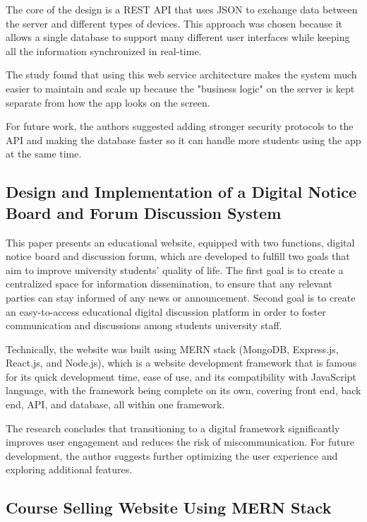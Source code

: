 The core of the design is a REST API that uses JSON to exchange data between the server and different types of devices. This approach was chosen because it allows a single database to support many different user interfaces while keeping all the information synchronized in real-time.

The study found that using this web service architecture makes the system much easier to maintain and scale up because the "business logic" on the server is kept separate from how the app looks on the screen.

For future work, the authors suggested adding stronger security protocols to the API and making the database faster so it can handle more students using the app at the same time.

\subsection{Design and Implementation of a Digital Notice Board and Forum Discussion System \cite{paper_11}}

This paper presents an educational website, equipped with two functions, digital notice board and discussion forum, which are developed to fulfill two goals that aim to improve university students' quality of life. The first goal is to create a centralized space for information dissemination, to ensure that any relevant parties can stay informed of any news or announcement. Second goal is to create an easy-to-access educational digital discussion platform in order to foster communication and discussions among students university staff. 

Technically, the website was built using MERN stack (MongoDB, Express.js, React.js, and Node.js), which is a website development framework that is famous for its quick development time, ease of use, and its compatibility with JavaScript language, with the framework being complete on its own, covering front end, back end, API, and database, all within one framework.

The research concludes that transitioning to a digital framework significantly improves user engagement and reduces the risk of miscommunication. For future development, the author suggests further optimizing the user experience and exploring additional features.

\subsection{Course Selling Website Using MERN Stack \cite{paper_12}}

